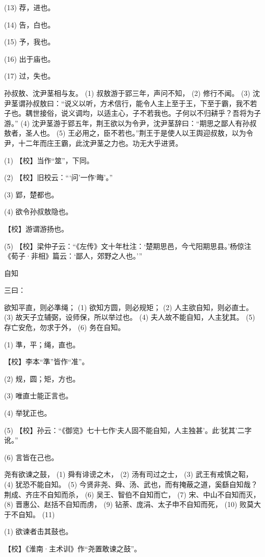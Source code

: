 \documentclass[12pt,UTF8]{ctexbook}
\begin{document}
(13) 荐，进也。

(14) 告，白也。

(15) 予，我也。

(16) 出于庙也。

(17) 过，失也。

孙叔敖、沈尹茎相与友。 (1) 叔敖游于郢三年，声问不知， (2) 修行不闻。 (3) 沈尹茎谓孙叔敖曰：“说义以听，方术信行，能令人主上至于王，下至于霸，我不若子也。耦世接俗，说义调均，以适主心，子不若我也。子何以不归耕乎？吾将为子游。” (4) 沈尹茎游于郢五年，荆王欲以为令尹，沈尹茎辞曰：“期思之鄙人有孙叔敖者，圣人也。 (5) 王必用之，臣不若也。”荆王于是使人以王舆迎叔敖，以为令尹，十二年而庄王霸，此沈尹茎之力也。功无大乎进贤。

(1) 【校】当作“筮”，下同。

(2) 【校】旧校云：“‘问’一作‘晦’。”

(3) 郢，楚都也。

(4) 欲令孙叔敖隐也。

【校】游谓游扬也。

(5) 【校】梁仲子云：“《左传》文十年杜注：‘楚期思邑，今弋阳期思县。’杨倞注《荀子·非相》篇云：‘鄙人，郊野之人也。’”





自知


三曰：

欲知平直，则必準绳； (1) 欲知方圆，则必规矩； (2) 人主欲自知，则必直士。 (3) 故天子立辅弼，设师保，所以举过也。 (4) 夫人故不能自知，人主犹其。 (5) 存亡安危，勿求于外， (6) 务在自知。

(1) 準，平；绳，直也。

【校】李本“準”皆作“准”。

(2) 规，圆；矩，方也。

(3) 唯直士能正言也。

(4) 举犹正也。

(5) 【校】孙云：“《御览》七十七作‘夫人固不能自知，人主独甚’。此‘犹其’二字讹。”

(6) 言皆在己也。

尧有欲谏之鼓， (1) 舜有诽谤之木， (2) 汤有司过之士， (3) 武王有戒慎之鞀， (4) 犹恐不能自知。 (5) 今贤非尧、舜、汤、武也，而有掩蔽之道，奚繇自知哉？荆成、齐庄不自知而杀， (6) 吴王、智伯不自知而亡， (7) 宋、中山不自知而灭， (8) 晋惠公、赵括不自知而虏， (9) 钻荼、庞涓、太子申不自知而死， (10) 败莫大于不自知。 (11)

(1) 欲谏者击其鼓也。

【校】《淮南·主术训》作“尧置敢谏之鼓”。
\end{document}
